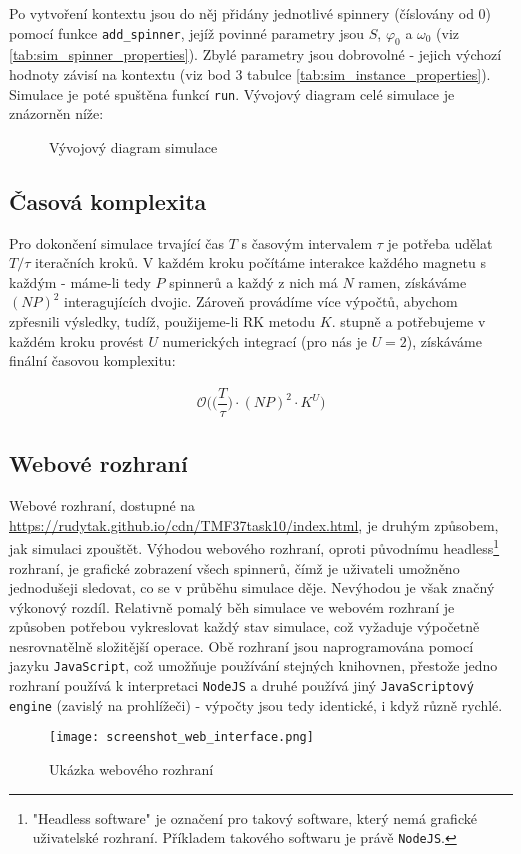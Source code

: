 Po vytvoření kontextu jsou do něj přidány jednotlivé spinnery (číslovány od 0) pomocí funkce \texttt{add\_spinner}, jejíž povinné parametry jsou $S$, $\varphi_0$ a $\omega_0$ (viz \autoref{tab:sim_spinner_properties}). Zbylé parametry jsou dobrovolné - jejich výchozí hodnoty závisí na kontextu (viz bod 3 tabulce \ref{tab:sim_instance_properties}). Simulace je poté spuštěna funkcí \texttt{run}.
Vývojový diagram celé simulace je znázorněn níže:

\begin{figure}[!ht]
    
    \caption{Vývojový diagram simulace}
    \label{fig:flowchart}
\end{figure}

\clearpage

\subsection{Časová komplexita}

Pro dokončení simulace trvající čas $T$ s časovým intervalem $\tau$ je potřeba udělat $T/\tau$ iteračních kroků. V každém kroku počítáme interakce každého magnetu s každým - máme-li tedy $P$ spinnerů a každý z nich má $N$ ramen, získáváme $(NP)^2$ interagujících dvojic. Zároveň provádíme více výpočtů, abychom zpřesnili výsledky, tudíž, použijeme-li RK metodu $K$. stupně a potřebujeme v každém kroku provést $U$ numerických integrací (pro nás je $U = 2$), získáváme finální časovou komplexitu:

\begin{equation}
    \label{eq:sim_complexity}
    \begin{gathered}
        \mathcal{O} \bigg( \bigg( \dfrac{T}{\tau} \bigg) \cdot (N P)^2 \cdot K^U \bigg)
    \end{gathered}
\end{equation}

\subsection{Webové rozhraní}

Webové rozhraní, dostupné na \url{https://rudytak.github.io/cdn/TMF37task10/index.html}, je druhým způsobem, jak simulaci zpouštět. Výhodou webového rozhraní, oproti původnímu headless\footnote{"Headless software" je označení pro takový software, který nemá grafické uživatelské rozhraní. Příkladem takového softwaru je právě \texttt{NodeJS}.} rozhraní, je grafické zobrazení všech spinnerů, čímž je uživateli umožněno jednodušeji sledovat, co se v průběhu simulace děje. Nevýhodou je však značný výkonový rozdíl. Relativně pomalý běh simulace ve webovém rozhraní je způsoben potřebou vykreslovat každý stav simulace, což vyžaduje výpočetně nesrovnatělně složitější operace. 
Obě rozhraní jsou naprogramována pomocí jazyku \texttt{JavaScript}, což umožňuje používání stejných knihovnen, přestože jedno rozhraní používá k interpretaci \texttt{NodeJS} a druhé používá jiný \texttt{JavaScriptový engine} (zavislý na prohlížeči) - výpočty jsou tedy identické, i když různě rychlé.

\begin{figure}[!ht]
    \centering
    \texttt{[image: screenshot\_web\_interface.png]}
    \caption{Ukázka webového rozhraní}
    \label{fig:web_interface}
\end{figure}